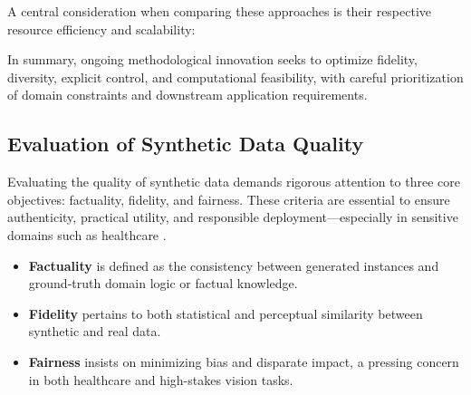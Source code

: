 A central consideration when comparing these approaches is their respective resource efficiency and scalability:


In summary, ongoing methodological innovation seeks to optimize fidelity, diversity, explicit control, and computational feasibility, with careful prioritization of domain constraints and downstream application requirements.

\subsection{Evaluation of Synthetic Data Quality}

Evaluating the quality of synthetic data demands rigorous attention to three core objectives: factuality, fidelity, and fairness. These criteria are essential to ensure authenticity, practical utility, and responsible deployment—especially in sensitive domains such as healthcare \cite{ref87}\cite{ref88}\cite{ref89}. 

\begin{itemize}
    \item \textbf{Factuality} is defined as the consistency between generated instances and ground-truth domain logic or factual knowledge.
    \item \textbf{Fidelity} pertains to both statistical and perceptual similarity between synthetic and real data.
    \item \textbf{Fairness} insists on minimizing bias and disparate impact, a pressing concern in both healthcare and high-stakes vision tasks.
\end{itemize}

